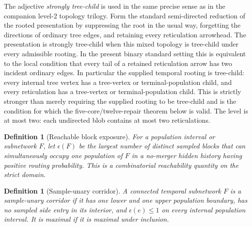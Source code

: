 \documentclass[11pt]{article}
\newtheorem{definition}[theorem]{Definition}
\begin{document}
The adjective \emph{strongly tree-child} is used in the same precise sense as in the companion level-2 topology trilogy.  Form the standard semi-directed reduction of the rooted presentation by suppressing the root in the usual way, forgetting the directions of ordinary tree edges, and retaining every reticulation arrowhead.  The presentation is strongly tree-child when this mixed topology is tree-child under every admissible rooting.  In the present binary standard setting this is equivalent to the local condition that every tail of a retained reticulation arrow has two incident ordinary edges.  In particular the supplied temporal rooting is tree-child: every internal tree vertex has a tree-vertex or terminal-population child, and every reticulation has a tree-vertex or terminal-population child.  This is strictly stronger than merely requiring the supplied rooting to be tree-child and is the condition for which the five-core/twelve-repair theorem below is valid.  The level is at most two: each undirected blob contains at most two reticulations.

\begin{definition}[Reachable block exposure]
For a population interval or subnetwork $F$, let $\epsilon(F)$ be the largest number of distinct sampled blocks that can simultaneously occupy one population of $F$ in a no-merger hidden history having positive routing probability.  This is a combinatorial reachability quantity on the strict domain.
\end{definition}

\begin{definition}[Sample-unary corridor]
A connected temporal subnetwork $F$ is a sample-unary corridor if it has one lower and one upper population boundary, has no sampled side entry in its interior, and $\epsilon(e)\le1$ on every internal population interval.  It is maximal if it is maximal under inclusion.
\end{definition}
\end{document}
